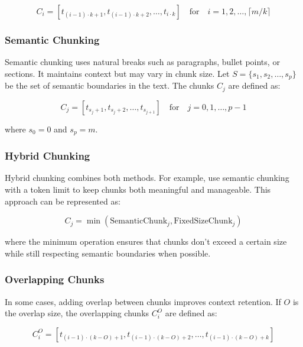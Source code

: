 \documentclass{article}
\begin{document}
\begin{equation}
C_i = [t_{(i-1) \cdot k + 1}, t_{(i-1) \cdot k + 2}, \ldots, t_{i \cdot k}] \quad \textrm{for} \quad i = 1, 2, \ldots, \lceil m/k \rceil
\end{equation}

\subsubsection{Semantic Chunking}

Semantic chunking uses natural breaks such as paragraphs, bullet points, or sections. It maintains context but may vary in chunk size. Let $S = \{s_1, s_2, \ldots, s_p\}$ be the set of semantic boundaries in the text. The chunks $C_j$ are defined as:

\begin{equation}
C_j = [t_{s_j + 1}, t_{s_j + 2}, \ldots, t_{s_{j+1}}] \quad \textrm{for} \quad j = 0, 1, \ldots, p-1
\end{equation}

where $s_0 = 0$ and $s_p = m$.

\subsubsection{Hybrid Chunking}

Hybrid chunking combines both methods. For example, use semantic chunking with a token limit to keep chunks both meaningful and manageable. This approach can be represented as:

\begin{equation}
C_j = \min(\textrm{SemanticChunk}_j, \textrm{FixedSizeChunk}_j)
\end{equation}

where the minimum operation ensures that chunks don't exceed a certain size while still respecting semantic boundaries when possible.

\subsubsection{Overlapping Chunks}

In some cases, adding overlap between chunks improves context retention. If $O$ is the overlap size, the overlapping chunks $C_i^O$ are defined as:

\begin{equation}
C_i^O = [t_{(i-1) \cdot (k-O) + 1}, t_{(i-1) \cdot (k-O) + 2}, \ldots, t_{(i-1) \cdot (k-O) + k}]
\end{equation}
\end{document}
